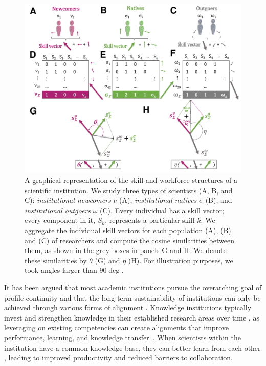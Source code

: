 \documentclass[draft,final]{vutinfth} %
\begin{document}
\begin{figure} [!t] %
\centering
\includegraphics[width=0.95\linewidth]{figures_alignment/figure1abcdefgh_method.pdf}
\caption{A graphical representation of the skill and workforce structures of a scientific institution. We study three types of scientists (A, B, and C): \textit{institutional newcomers} $\nu$ (A), \textit{institutional natives} $\sigma$ (B), and \textit{institutional outgoers} $\omega$ (C). Every individual has a skill vector; every component in it, $S_k$, represents a particular skill $k$. We aggregate the individual skill vectors for each population (A), (B) and (C) of researchers and compute the cosine similarities between them, as shown in the grey boxes in panels G and H. We denote these similarities by $\theta$ (G) and $\eta$ (H). For illustration purposes, we took angles larger than $90\deg$.}
\label{Fig1:figure1abcdefgh_method.pdf}
\end{figure}

It has been argued that most academic institutions pursue the overarching goal of profile continuity \cite{heinze2008sponsor, march1991exploration} and that the long-term sustainability of institutions can only be achieved through various forms of alignment \cite{adams1996measuring}. Knowledge institutions typically invest and strengthen knowledge in their established research areas over time \cite{thurner2020role}, as leveraging on existing competencies can create alignments that improve performance, learning, and knowledge transfer~\cite{arthur1984competing, cohen1990absorptive}. When scientists within the institution have a common knowledge base, they can better learn from each other \cite{cohen1990absorptive}, leading to improved productivity and reduced barriers to collaboration. 
\end{document}
